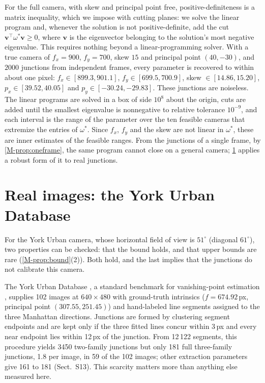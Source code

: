 For the full camera, with skew and principal point free, positive-definiteness is a matrix inequality, which we impose with cutting planes: we solve the linear program and, whenever the solution is not positive-definite, add the cut $\mathbf v^{\top}\omega^{*}\mathbf v\ge0$, where $\mathbf v$ is the eigenvector belonging to the solution's most negative eigenvalue. This requires nothing beyond a linear-programming solver. With a true camera of $f_x=900$, $f_y=700$, skew $15$ and principal point $(40,-30)$, and $2000$ junctions from independent frames, every parameter is recovered to within about one pixel: $f_x\in[899.3,901.1]$, $f_y\in[699.5,700.9]$, skew $\in[14.86,15.20]$, $p_x\in[39.52,40.05]$ and $p_y\in[-30.24,-29.83]$. These junctions are noiseless. The linear programs are solved in a box of side $10^8$ about the origin, cuts are added until the smallest eigenvalue is nonnegative to relative tolerance $10^{-9}$, and each interval is the range of the parameter over the ten feasible cameras that extremize the entries of $\omega^{*}$. Since $f_x$, $f_y$ and the skew are not linear in $\omega^{*}$, these are inner estimates of the feasible ranges. From the junctions of a single frame, by \cref{M-prop:oneframe}, the same program cannot close on a general camera; \cref{sec:e4} applies a robust form of it to real junctions.

\section{Real images: the York Urban Database}\label{sec:e4}
For the York Urban camera, whose horizontal field of view is $51^\circ$ (diagonal $61^\circ$), two properties can be checked: that the bound holds, and that upper bounds are rare (\cref{M-prop:bound}(2)). Both hold, and the last implies that the junctions do not calibrate this camera.

The York Urban Database \citep{denis2008}, a standard benchmark for vanishing-point estimation \citep{tardif2009}, supplies 102 images at $640\times480$ with ground-truth intrinsics ($f=674.92$\,px, principal point $(307.55,251.45)$) and hand-labeled line segments assigned to the three Manhattan directions. Junctions are formed by clustering segment endpoints and are kept only if the three fitted lines concur within 3\,px and every near endpoint lies within 12\,px of the junction. From 12\,122 segments, this procedure yields 3450 two-family junctions but only 181 full three-family junctions, 1.8 per image, in 59 of the 102 images; other extraction parameters give 161 to 181 (Sect.~S13). This scarcity matters more than anything else measured here.

